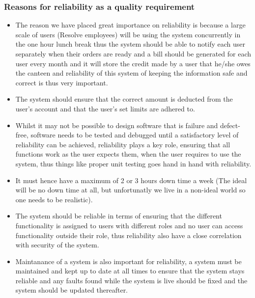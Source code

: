 \documentclass[a4paper,12pt]{article}
\begin{document}
\subsubsection{Reasons for reliability as a quality requirement}
\begin{itemize}
\item The reason we have placed great importance on reliability is because a large scale of users (Resolve employees) will be using the system concurrently in the one hour lunch break thus the system should be able to notify each user separately when their orders are ready and a bill should be generated for each user every month and it  will store the credit made by a user that he/she owes the canteen and reliability of this system of keeping the information safe and correct is thus very important.
\item The system should ensure that the correct amount is deducted from the user's account and that the user's set limits are adhered to.
\item Whilst it may not be possible to design software that is failure and defect-free, software needs to be tested and debugged 
until a satisfactory level of reliability can be achieved, reliability plays a key role, ensuring that all functions work as the user expects them, when the user requires to use the system, thus things like proper unit testing goes hand in hand with reliability.
\item It must hence have a maximum of 2 or 3 hours down time a week (The ideal will be no down time at all, but unfortunatly we live in a non-ideal world so one needs to be realistic).
\item The system should be reliable in terms of ensuring that the different functionality is assigned to users with different roles and no user can access functionality outside their role, thus reliability also have a close correlation with security of the system.  
\item Maintanance of a system is also important for reliability, a system must be maintained and kept up to date at all times to ensure that the system stays reliable and any faults found while the system is live should be fixed and the system should be updated thereafter.
\end{itemize}
\end{document}
